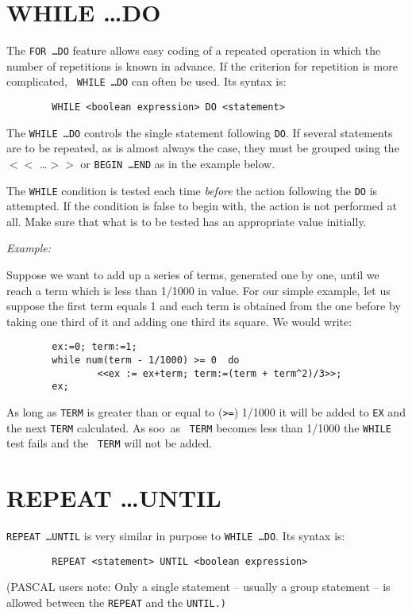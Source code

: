 \section{WHILE \ldots DO}

The {\tt FOR \ldots DO}  feature allows easy
coding of a repeated operation in which the number of repetitions is known
in advance.  If the criterion for repetition is more complicated, {\tt
WHILE \ldots DO} can often be used.  Its syntax is:
\begin{verbatim}
        WHILE <boolean expression> DO <statement>
\end{verbatim}
The {\tt WHILE \ldots  DO} controls the single statement following {\tt DO}.
If several statements are to be repeated, as is almost always the case,
they must be grouped using the $<<$ \ldots $>>$ or {\tt BEGIN \ldots END}
as in the example below.

The {\tt WHILE} condition is tested each time {\em before} the action
following the {\tt DO} is attempted.  If the condition is false to begin
with, the action is not performed at all.  Make sure that what is to be
tested has an appropriate value initially.

{\it Example:}

Suppose we want to add up a series of terms, generated one by one, until
we reach a term which is less than 1/1000 in value.  For our simple
example, let us suppose the first term equals 1 and each term is obtained
from the one before by taking one third of it and adding one third its
square. We would write:
\begin{verbatim}
        ex:=0; term:=1;
        while num(term - 1/1000) >= 0  do
                <<ex := ex+term; term:=(term + term^2)/3>>;
        ex;
\end{verbatim}
As long as {\tt TERM} is greater than or equal to ({\tt >=}) 1/1000 it will
be added to {\tt EX} and the next {\tt TERM} calculated.  As soo\ as {\tt
TERM} becomes less than 1/1000 the {\tt WHILE} test fails and the {\tt
TERM} will not be added.


\section{REPEAT \ldots UNTIL}

 {\tt REPEAT \ldots  UNTIL} is very similar in purpose to
{\tt WHILE \ldots DO}.  Its syntax is:
\begin{verbatim}
        REPEAT <statement> UNTIL <boolean expression>
\end{verbatim}
(PASCAL users note: Only a single statement -- usually a group statement
-- is allowed between the {\tt REPEAT} and the {\tt UNTIL.)} \\

